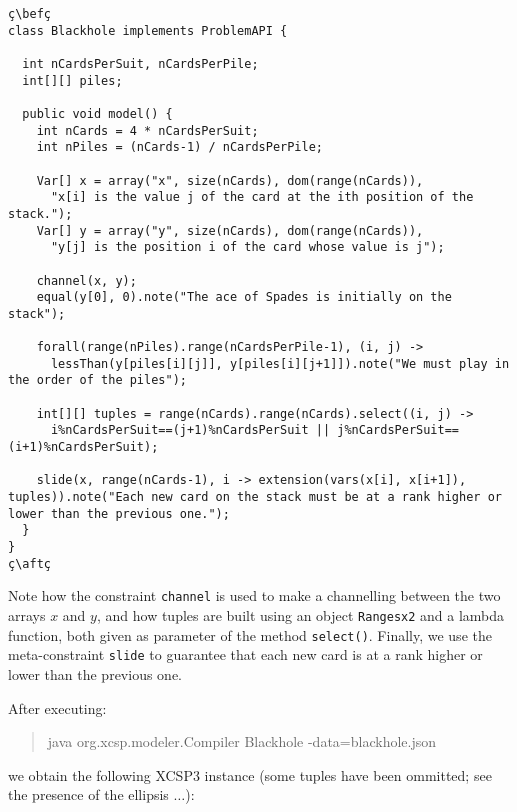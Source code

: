 \documentclass[10pt]{article}
\def\xt{{\rm XCSP3}\xspace}
\newcommand{\gb}[1]{{\tt #1}} %
\newcommand{\nn}[1]{{\tt #1}} %
\def\xt{{\rm XCSP3}\xspace}
\newenvironment{myvb}{\endgraf\small\verbatim}{\endverbatim}
\def\bef{\rule{10cm}{0.1mm}} %
\def\aft{\rule{10cm}{0.1mm}\medskip}
\begin{document}
\begin{lstlisting}
ç\befç
class Blackhole implements ProblemAPI {

  int nCardsPerSuit, nCardsPerPile;
  int[][] piles;

  public void model() {
    int nCards = 4 * nCardsPerSuit;
    int nPiles = (nCards-1) / nCardsPerPile;
    
    Var[] x = array("x", size(nCards), dom(range(nCards)),
      "x[i] is the value j of the card at the ith position of the stack.");
    Var[] y = array("y", size(nCards), dom(range(nCards)),
      "y[j] is the position i of the card whose value is j");
    
    channel(x, y);
    equal(y[0], 0).note("The ace of Spades is initially on the stack");
    
    forall(range(nPiles).range(nCardsPerPile-1), (i, j) ->
      lessThan(y[piles[i][j]], y[piles[i][j+1]]).note("We must play in the order of the piles");
    
    int[][] tuples = range(nCards).range(nCards).select((i, j) ->
      i%nCardsPerSuit==(j+1)%nCardsPerSuit || j%nCardsPerSuit==(i+1)%nCardsPerSuit);

    slide(x, range(nCards-1), i -> extension(vars(x[i], x[i+1]), tuples)).note("Each new card on the stack must be at a rank higher or lower than the previous one.");            
  }
}
ç\aftç
\end{lstlisting}  

Note how the constraint \gb{channel} is used to make a channelling between the two arrays $x$ and $y$,
and how tuples are built using an object \nn{Rangesx2} and a lambda function, both given as parameter of the method \nn{select()}.
Finally, we use the meta-constraint \gb{slide} to guarantee that each new card is at a rank higher or lower than the previous one.


After executing:
\begin{quote}
\begin{myvb}
java org.xcsp.modeler.Compiler Blackhole -data=blackhole.json
\end{myvb}
\end{quote}
we obtain the following \xt instance (some tuples have been ommitted; see the presence of the ellipsis $\dots$):
\end{document}
